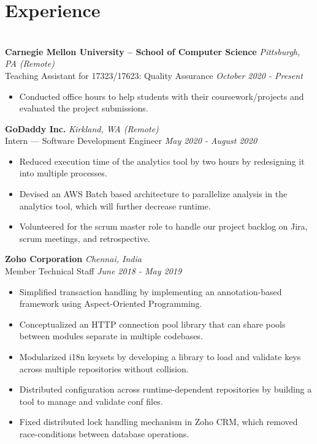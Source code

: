 \documentclass{resume}
\begin{document}
\section*{Experience}
\titlerule
\noindent
\\
\textbf{Carnegie Mellon University -- School of Computer Science} \hfill \textit{Pittsburgh, PA (Remote)} \\
{\small Teaching Assistant for 17323/17623: Quality Assurance} \hfill \textit{\small October 2020 - Present}
\begin{itemize}
  \item Conducted office hours to help students with their coursework/projects and evaluated the project submissions.
\end{itemize}
\textbf{GoDaddy Inc.} \hfill \textit{Kirkland, WA (Remote)} \\
{\small Intern --- Software Development Engineer} \hfill \textit{\small May 2020 - August 2020}
\begin{itemize}
  \item Reduced execution time of the analytics tool by two hours by redesigning it into multiple processes.
  \item Devised an AWS Batch based architecture to parallelize analysis in the analytics tool, which will further decrease runtime.
  \item Volunteered for the scrum master role to handle our project backlog on Jira, scrum meetings, and retrospective.
\end{itemize}
\textbf{Zoho Corporation} \hfill \textit{Chennai, India} \\
{\small Member Technical Staff} \hfill \textit{\small June 2018 - May 2019}
\begin{itemize}
  \item Simplified transaction handling by implementing an annotation-based framework using Aspect-Oriented Programming.
  \item Conceptualized an HTTP connection pool library that can share pools between modules separate in multiple codebases.
  \item Modularized i18n keysets by developing a library to load and validate keys across multiple repositories without collision.
  \item Distributed configuration across runtime-dependent repositories by building a tool to manage and validate conf files.
  \item Fixed distributed lock handling mechanism in Zoho CRM, which removed race-conditions between database operations.
\end{itemize}
\end{document}
